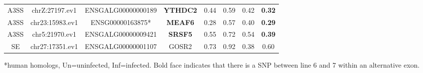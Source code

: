 \documentclass[10pt]{article}
\begin{document}
\begin{table}[!ht]
\begin{tabular}{cccccccc}
A3SS & chrZ:27197.ev1 & ENSGALG00000000189 & \textbf{YTHDC2} & 0.44 & 0.59 & 0.42 & \textbf{0.32} \\
A3SS & chr23:15983.ev1 & ENSG00000163875* & \textbf{MEAF6} & 0.28 & 0.57 & 0.40 & \textbf{0.29} \\
A3SS & chr5:21970.ev1 & ENSGALG00000009421 & \textbf{SRSF5} & 0.55 & 0.72 & 0.54 & \textbf{0.39} \\
\hline
SE & chr27:17351.ev1 & ENSGALG00000001107 & GOSR2 & 0.73 & 0.92 & 0.38 & 0.60 \\
\hline
\end{tabular}
\begin{flushleft}
    *human homologs, Un=uninfected, Inf=infected.
    Bold face indicates that there is a SNP between line 6 and 7 within an alternative exon.
\end{flushleft}
\label{tab:line67i_diff_line67u_three}
\end{table}

\end{document}
